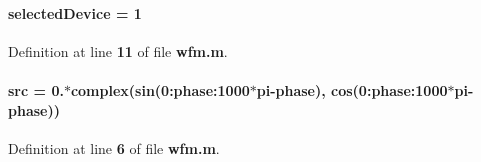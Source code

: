 \paragraph[{selected\+Device}]{\setlength{\rightskip}{0pt plus 5cm}selected\+Device = 1}\label{wfm_8m_acd2c4687ab27ac6fc361252862fc9a88}


Definition at line {\bf 11} of file {\bf wfm.\+m}.

\paragraph[{src}]{\setlength{\rightskip}{0pt plus 5cm}src = 0.$\ast$complex(sin(0\+:phase\+:1000$\ast$pi-\/{\bf phase}), cos(0\+:phase\+:1000$\ast$pi-\/{\bf phase}))}\label{wfm_8m_a0e9117de7e6a340559202f88a1dbd9c6}


Definition at line {\bf 6} of file {\bf wfm.\+m}.

